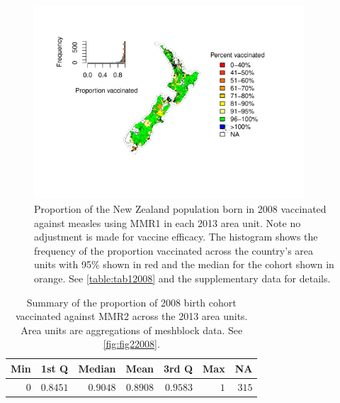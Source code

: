 \documentclass{article}
\begin{document}
\begin{figure}
\begin{center}
    \includegraphics[width=0.9\textwidth]{nir_census_MMR1_NIR_2008.pdf}
\end{center}
    \caption{Proportion of the New Zealand population born in 2008 vaccinated against measles using MMR1 in each 2013 area unit. Note no adjustment is made for vaccine efficacy. The histogram shows the frequency of the proportion vaccinated across the country's area units with 95\% shown in red and the median for the cohort shown in orange. See \autoref{table:tab12008} and the supplementary data for details.}
\label{fig:fig12008}
\end{figure}

 \vspace{5mm} %
\begin{table}
\begin{center}
\begin{tabular}{rrrrrrr}
\hline\hline
\multicolumn{1}{c}{Min}&\multicolumn{1}{c}{1st Q}&\multicolumn{1}{c}{Median}&\multicolumn{1}{c}{Mean}&\multicolumn{1}{c}{3rd Q}&\multicolumn{1}{c}{Max}&\multicolumn{1}{c}{NA}\tabularnewline
\hline
$0$&$0.8451$&$0.9048$&$0.8908$&$0.9583$&$1$&$315$\tabularnewline
\hline
\end{tabular}\end{center}\caption{Summary of the proportion of 2008 birth cohort vaccinated against MMR2 across the 2013 area units. Area units are aggregations of meshblock data. See \autoref{fig:fig22008}.}
\label{table:tab22008}
\end{table}
\end{document}
